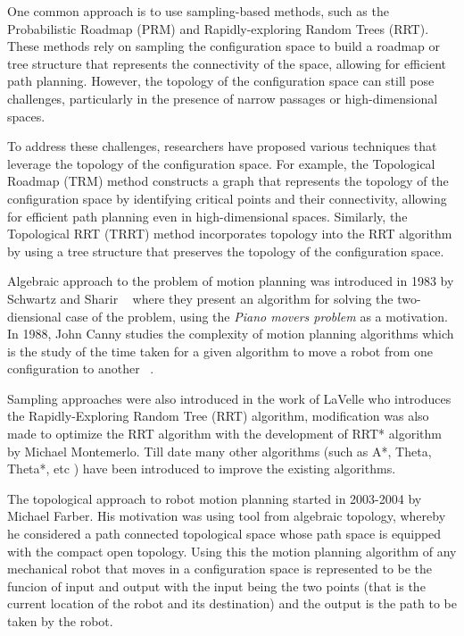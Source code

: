 One common approach is to use sampling-based methods, such as the Probabilistic Roadmap (PRM) and Rapidly-exploring Random Trees (RRT). These methods rely on sampling the configuration space to build a roadmap or tree structure that represents the connectivity of the space, allowing for efficient path planning. However, the topology of the configuration space can still pose challenges, particularly in the presence of narrow passages or high-dimensional spaces.

To address these challenges, researchers have proposed various techniques that leverage the topology of the configuration space. For example, the Topological Roadmap (TRM) method constructs a graph that represents the topology of the configuration space by identifying critical points and their connectivity, allowing for efficient path planning even in high-dimensional spaces. Similarly, the Topological RRT (TRRT) method incorporates topology into the RRT algorithm by using a tree structure that preserves the topology of the configuration space.

Algebraic approach to the problem of motion planning was introduced in 1983 by Schwartz and Sharir ~\cite{schwartz:1983a} where they present an algorithm for solving the two-diensional case of the problem, using the \textit{Piano movers problem} as a motivation. In 1988, John Canny studies the complexity of motion planning algorithms which is the study of the time taken for a given algorithm to move a robot from one configuration to another ~\cite{canny1988}.

Sampling approaches were also introduced in the work of LaVelle who introduces the Rapidly-Exploring Random Tree (RRT) algorithm, modification was also made to optimize the RRT algorithm with the development of RRT* algorithm by Michael Montemerlo. Till date many other algorithms (such as A*, Theta, Theta*, etc ) have been introduced to improve the existing algorithms.

The topological approach to robot motion planning started in 2003-2004 by Michael Farber. His motivation was using tool from algebraic topology, whereby he considered a path connected topological space whose path space is equipped with the compact open topology. Using this the motion planning algorithm of any mechanical robot that moves in a configuration space is represented to be the funcion of input and output with the input being the two points (that is the current location of the robot and its destination) and the output is the path to be taken by the robot.


